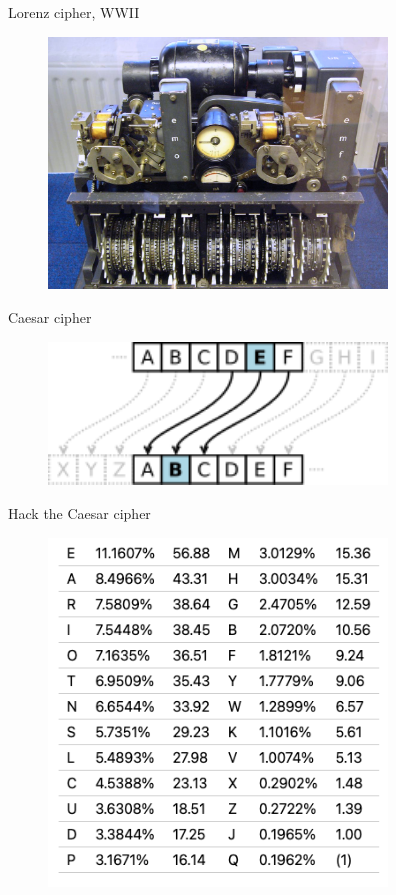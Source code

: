 \documentclass[10pt,pdf,hyperref={unicode}]{beamer}
\begin{document}
\begin{frame}{Lorenz cipher, WWII}
 \begin{figure} 
   \includegraphics[width=90mm,scale=0.5]{class_crypto.jpg}
  \end{figure}
\end{frame}


\begin{frame}{Caesar cipher}
 \begin{figure} 
   \includegraphics[width=90mm,scale=0.5]{caesar_cipher.png}
  \end{figure}
\end{frame}

\begin{frame}{Hack the Caesar cipher}
 \begin{figure} 
   \includegraphics[width=90mm,scale=0.5]{english_letters}
  \end{figure}
\end{frame}
\end{document}
